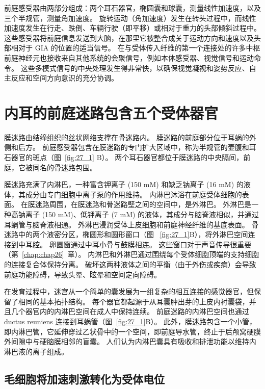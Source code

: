 前庭感受器由两部分组成：两个耳石器官，椭圆囊和球囊，测量线性加速度，以及三个半规管，测量角加速度。
旋转运动（角加速度）发生在转头过程中，而线性加速度发生在行走、跌倒、车辆行驶（即平移）或相对于重力的头部倾斜过程中。
这些感受器将前庭信息发送到大脑，在那里它被整合成关于运动方向和速度以及头部相对于 GIA 的位置的适当信号。
在与受体传入纤维的第一个连接处的许多中枢前庭神经元也接收来自其他系统的会聚信号，例如本体感受器、视觉信号和运动命令。
这些多模式信号的中央处理发生得非常快，以确保视觉凝视和姿势反应、自主反应和空间方向意识的充分协调。



\section{内耳的前庭迷路包含五个受体器官}

膜迷路由结缔组织的丝状网络支撑在骨迷路内。
膜迷路的前庭部分位于耳蜗的外侧和后方。
前庭感受器包含在膜迷路的专门扩大区域中，称为半规管的壶腹和耳石器官的斑点（图~\ref{fig:27_1} B）。
两个耳石器官都位于膜迷路的中央隔间，前庭，它被同名的骨迷路包围。


膜迷路充满了内淋巴，一种富含钾离子 (150 mM) 和缺乏钠离子 (16 mM) 的液体，其成分由专门细胞中离子泵的作用维持。
内淋巴沐浴在前庭受体细胞的表面。
在膜迷路周围，在膜迷路和骨迷路壁之间的空间中，是外淋巴。
外淋巴是一种高钠离子 (150 mM)、低钾离子 (7 mM) 的液体，其成分与脑脊液相似，并通过耳蜗管与脑脊液相通。
外淋巴浸润受体上皮细胞和前庭神经纤维的基底表面。 骨迷路中的两个液密分区，椭圆形和圆形窗口（图 ~\ref{fig:27_1}B），将外淋巴空间连接到中耳腔。 卵圆窗通过中耳小骨与鼓膜相连。
这些窗口对于声音传导很重要（第~\ref{chap:chap26}~章）。
内淋巴和外淋巴通过围绕每个受体细胞顶端的支持细胞的连接复合体保持分离。
破坏这两种液体之间的平衡（由于外伤或疾病）会导致前庭功能障碍，导致头晕、眩晕和空间定向障碍。


在发育过程中，迷宫从一个简单的囊发展为一组复杂的相互连接的感觉器官，但保留了相同的基本拓扑结构。
每个器官都起源于从耳囊肿出芽的上皮内衬囊袋，并且几个器官内的内淋巴空间在成人中保持连续。
前庭迷路的内淋巴空间也通过 ductus reuniens 连接到耳蜗管（图~\ref{fig:27_1}B）。
此外，膜迷路包含一个小管，即内淋巴管，它延伸穿过乙状骨中的一个空间，即前庭导水管，终止于后颅窝硬膜外间隙中与硬脑膜相邻的盲囊。
人们认为内淋巴囊具有吸收和排泄功能以维持内淋巴液的离子组成。



\subsection{毛细胞将加速刺激转化为受体电位}


